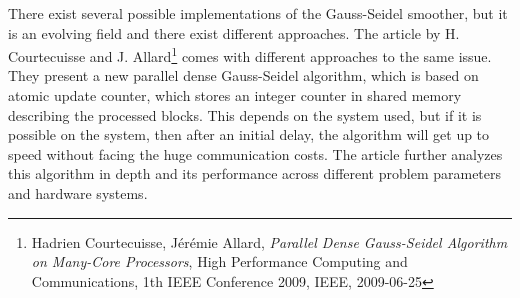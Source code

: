 There exist several possible implementations of the Gauss-Seidel smoother, but it is an evolving field and there exist different approaches. The article by H. Courtecuisse and J. Allard\footnote{Hadrien Courtecuisse, J\'{e}r\'{e}mie Allard, \textit{Parallel Dense Gauss-Seidel Algorithm on Many-Core Processors}, High Performance Computing and Communications, 1th IEEE Conference 2009, IEEE, 2009-06-25} comes with different approaches to the same issue. They present a new parallel dense Gauss-Seidel algorithm, which is based on atomic update counter, which stores an integer counter in shared memory describing the processed blocks. This depends on the system used, but if it is possible on the system, then after an initial delay, the algorithm will get up to speed without facing the huge communication costs. The article further analyzes this algorithm in depth and its performance across different problem parameters and hardware systems.\\
